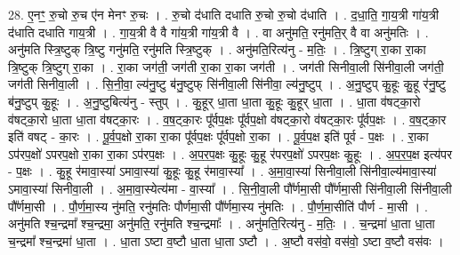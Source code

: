\documentclass[17pt]{extarticle}
\begin{document}
28. ए॒नꣳ॒॒ रु॒चो रु॒च ए॑न मेनꣳ रु॒चः । . रु॒चो द॑धाति दधाति रु॒चो रु॒चो द॑धाति । . द॒धा॒ति॒ गा॒य॒त्री गा॑य॒त्री द॑धाति दधाति गाय॒त्री । . गा॒य॒त्री वै वै गा॑य॒त्री गा॑य॒त्री वै । . वा अनु॑मति॒ रनु॑मति॒र् वै वा अनु॑मतिः । . अनु॑मति स्त्रि॒ष्टुक् त्रि॒ष्टु गनु॑मति॒ रनु॑मति स्त्रि॒ष्टुक् । . अनु॑मति॒रित्य॑नु - म॒तिः॒ । . त्रि॒ष्टुग् रा॒का रा॒का त्रि॒ष्टुक् त्रि॒ष्टुग् रा॒का । . रा॒का जग॑ती॒ जग॑ती रा॒का रा॒का जग॑ती । . जग॑ती सिनीवा॒ली सि॑नीवा॒ली जग॑ती॒ जग॑ती सिनीवा॒ली । . सि॒नी॒वा॒ ल्य॑नु॒ष्टु ब॑नु॒ष्टुफ् सि॑नीवा॒ली सि॑नीवा॒ ल्य॑नु॒ष्टुप् । . अ॒नु॒ष्टुप् कु॒हूः कु॒हू र॑नु॒ष्टु ब॑नु॒ष्टुप् कु॒हूः । . अ॒नु॒ष्टुबित्य॑नु - स्तुप् । . कु॒हूर् धा॒ता धा॒ता कु॒हूः कु॒हूर् धा॒ता । . धा॒ता व॑षट्का॒रो व॑षट्का॒रो धा॒ता धा॒ता व॑षट्का॒रः । . व॒ष॒ट्का॒रः पू᳚र्वप॒क्षः पू᳚र्वप॒क्षो व॑षट्का॒रो व॑षट्का॒रः पू᳚र्वप॒क्षः । . व॒ष॒ट्का॒र इति॑ वषट् - का॒रः । . पू॒र्व॒प॒क्षो रा॒का रा॒का पू᳚र्वप॒क्षः पू᳚र्वप॒क्षो रा॒का । . पू॒र्व॒प॒क्ष इति॑ पूर्व - प॒क्षः । . रा॒का ऽप॑रप॒क्षो॑ ऽपरप॒क्षो रा॒का रा॒का ऽप॑रप॒क्षः । . अ॒प॒र॒प॒क्षः कु॒हूः कु॒हू र॑परप॒क्षो॑ ऽपरप॒क्षः कु॒हूः । . अ॒प॒र॒प॒क्ष इत्य॑पर - प॒क्षः । . कु॒हू र॑मावा॒स्या॑ ऽमावा॒स्या॑ कु॒हूः कु॒हू र॑मावा॒स्या᳚ । . अ॒मा॒वा॒स्या॑ सिनीवा॒ली सि॑नीवा॒ल्य॑मावा॒स्या॑ ऽमावा॒स्या॑ सिनीवा॒ली । . अ॒मा॒वा॒स्येत्य॑मा - वा॒स्या᳚ । . सि॒नी॒वा॒ली पौ᳚र्णमा॒सी पौ᳚र्णमा॒सी सि॑नीवा॒ली सि॑नीवा॒ली पौ᳚र्णमा॒सी । . पौ॒र्ण॒मा॒स्य नु॑मति॒ रनु॑मतिः पौर्णमा॒सी पौ᳚र्णमा॒स्य नु॑मतिः । . पौ॒र्ण॒मा॒सीति॑ पौर्ण - मा॒सी । . अनु॑मति श्च॒न्द्रमा᳚ श्च॒न्द्रमा॒ अनु॑मति॒ रनु॑मति श्च॒न्द्रमाः᳚ । . अनु॑मति॒रित्य॑नु - म॒तिः॒ । . च॒न्द्रमा॑ धा॒ता धा॒ता च॒न्द्रमा᳚ श्च॒न्द्रमा॑ धा॒ता । . धा॒ता ऽष्टा व॒ष्टौ धा॒ता धा॒ता ऽष्टौ । . अ॒ष्टौ वस॑वो॒ वस॑वो॒ ऽष्टा व॒ष्टौ वस॑वः । \newline
\end{document}
